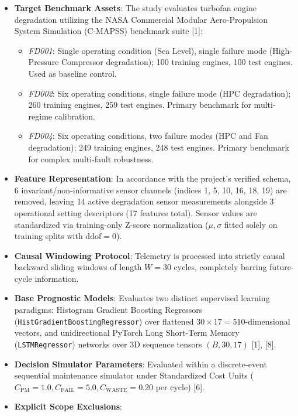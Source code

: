 \documentclass[12pt,a4paper]{article}
\begin{document}
\begin{itemize}
    \item \textbf{Target Benchmark Assets}: The study evaluates turbofan engine degradation utilizing the NASA Commercial Modular Aero-Propulsion System Simulation (C-MAPSS) benchmark suite [1]:
    \begin{itemize}
        \item \textit{FD001}: Single operating condition (Sea Level), single failure mode (High-Pressure Compressor degradation); 100 training engines, 100 test engines. Used as baseline control.
        \item \textit{FD002}: Six operating conditions, single failure mode (HPC degradation); 260 training engines, 259 test engines. Primary benchmark for multi-regime calibration.
        \item \textit{FD004}: Six operating conditions, two failure modes (HPC and Fan degradation); 249 training engines, 248 test engines. Primary benchmark for complex multi-fault robustness.
    \end{itemize}
    \item \textbf{Feature Representation}: In accordance with the project's verified schema, 6 invariant/non-informative sensor channels (indices 1, 5, 10, 16, 18, 19) are removed, leaving 14 active degradation sensor measurements alongside 3 operational setting descriptors (17 features total). Sensor values are standardized via training-only Z-score normalization ($\mu, \sigma$ fitted solely on training splits with $\text{ddof}=0$).
    \item \textbf{Causal Windowing Protocol}: Telemetry is processed into strictly causal backward sliding windows of length $W=30$ cycles, completely barring future-cycle information.
    \item \textbf{Base Prognostic Models}: Evaluates two distinct supervised learning paradigms: Histogram Gradient Boosting Regressors (\texttt{HistGradientBoostingRegressor}) over flattened $30 \times 17 = 510$-dimensional vectors, and unidirectional PyTorch Long Short-Term Memory (\texttt{LSTMRegressor}) networks over 3D sequence tensors $(B, 30, 17)$ [1], [8].
    \item \textbf{Decision Simulator Parameters}: Evaluated within a discrete-event sequential maintenance simulator under Standardized Cost Units ($C_{\text{PM}}=1.0, C_{\text{FAIL}}=5.0, C_{\text{WASTE}}=0.20$ per cycle) [6].
    \item \textbf{Explicit Scope Exclusions}:
    \begin{itemize}

\end{itemize}
\end{itemize}
\end{document}
